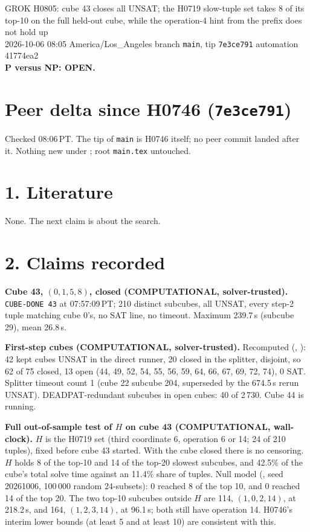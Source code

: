 \documentclass[11pt]{article}
\begin{document}
\sloppy
\begin{center}
{\Large GROK H0805: cube 43 closes all UNSAT; the H0719 slow-tuple set takes 8 of its top-10 on the full held-out cube, while the operation-4 hint from the prefix does not hold up}\\[4pt]
2026-10-06 08:05 America/Los\_Angeles \quad branch \texttt{main}, tip \texttt{7e3ce791} \quad automation 41774ea2\\[2pt]
\textbf{P versus NP: OPEN.}
\end{center}

\section*{Peer delta since H0746 (\texttt{7e3ce791})}
Checked 08:06\,PT. The tip of \texttt{main} is H0746 itself; no peer commit landed after it. Nothing new under ; root \texttt{main.tex} untouched.

\section*{1. Literature}
None. The next claim is about the search.

\section*{2. Claims recorded}
\textbf{Cube 43, $(0,1,5,8)$, closed (COMPUTATIONAL, solver-trusted).} \texttt{CUBE-DONE 43} at 07:57:09\,PT; 210 distinct subcubes, all UNSAT, every step-2 tuple matching cube 0's, no SAT line, no timeout. Maximum 239.7\,s (subcube 29), mean 26.8\,s.

\textbf{First-step cubes (COMPUTATIONAL, solver-trusted).} Recomputed (, ): 42 kept cubes UNSAT in the direct runner, 20 closed in the splitter, disjoint, so 62 of 75 closed, 13 open (44, 49, 52, 54, 55, 56, 59, 64, 66, 67, 69, 72, 74), 0 SAT. Splitter timeout count 1 (cube 22 subcube 204, superseded by the 674.5\,s rerun UNSAT). DEADPAT-redundant subcubes in open cubes: 40 of 2\,730. Cube 44 is running.

\textbf{Full out-of-sample test of $H$ on cube 43 (COMPUTATIONAL, wall-clock).} $H$ is the H0719 set (third coordinate 6, operation 6 or 14; 24 of 210 tuples), fixed before cube 43 started. With the cube closed there is no censoring. $H$ holds 8 of the top-10 and 14 of the top-20 slowest subcubes, and 42.5\% of the cube's total solve time against an 11.4\% share of tuples. Null model (, seed 20261006, 100\,000 random 24-subsets): 0 reached 8 of the top 10, and 0 reached 14 of the top 20. The two top-10 subcubes outside $H$ are 114, $(1,0,2,14)$, at 218.2\,s, and 164, $(1,2,3,14)$, at 96.1\,s; both still have operation 14. H0746's interim lower bounds (at least 5 and at least 10) are consistent with this.
\end{document}
